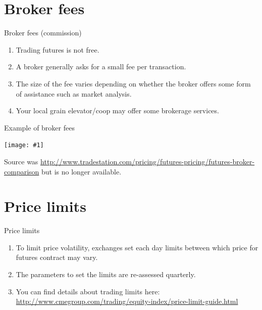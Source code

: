\documentclass[table,xcolor=pdftex,dvipsnames]{beamer}\usepackage[]{graphicx}\usepackage[]{color}
\newcommand {\framedgraphic}[1] {
        \begin{center}
            \texttt{[image: \#1]}
        \end{center}
        \vspace{-1\baselineskip}
}
\begin{document}
\section{Broker fees}

\begin{frame}{Broker fees (commission)}
\begin{enumerate}[label=\textbullet]
      \item Trading futures is not free.
      \item A broker generally asks for a small fee per transaction.
      \item The size of the fee varies depending on whether the broker offers some form of assistance such as market analysis.
      \item Your local grain elevator/coop may offer some brokerage services.
\end{enumerate}
\end{frame}


\begin{frame}{Example of broker fees}
    \framedgraphic{broker_fees.png}
Source was \url{http://www.tradestation.com/pricing/futures-pricing/futures-broker-comparison} but is no longer available.
\end{frame}

\section{Price limits}


\begin{frame}{Price limits}
\begin{enumerate}[label=\textbullet]
      \item To limit price volatility, exchanges set each day limits between which price for futures contract may vary.
      \item The parameters to set the limits are re-assessed quarterly.
      \item You can find details about trading limits here: \url{http://www.cmegroup.com/trading/equity-index/price-limit-guide.html}
\end{enumerate}
\end{frame}
\end{document}
